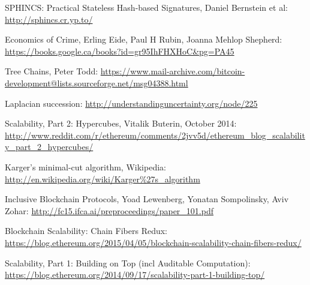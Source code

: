 \documentclass[11pt,a4paper]{article}
\theoremstyle{plain}
\theoremstyle{definition}
\theoremstyle{remark}
\begin{document}
\begin{thebibliography}{34}
    SPHINCS: Practical Stateless Hash-based Signatures, Daniel Bernstein et al: \url{http://sphincs.cr.yp.to/}

    Economics of Crime, Erling Eide, Paul H Rubin, Joanna Mehlop Shepherd: \url{https://books.google.ca/books?id=gr95IhFHXHoC&pg=PA45}

    Tree Chains, Peter Todd: \url{https://www.mail-archive.com/bitcoin-development@lists.sourceforge.net/msg04388.html}

    Laplacian succession: \url{http://understandinguncertainty.org/node/225}

    Scalability, Part 2: Hypercubes, Vitalik Buterin, October 2014: \url{http://www.reddit.com/r/ethereum/comments/2jvv5d/ethereum_blog_scalability_part_2_hypercubes/}

    Karger's minimal-cut algorithm, Wikipedia: \url{http://en.wikipedia.org/wiki/Karger%27s_algorithm}

    Inclusive Blockchain Protocols, Yoad Lewenberg, Yonatan Sompolinsky, Aviv Zohar: \url{http://fc15.ifca.ai/preproceedings/paper_101.pdf}

    Blockchain Scalability: Chain Fibers Redux: \url{https://blog.ethereum.org/2015/04/05/blockchain-scalability-chain-fibers-redux/}

    Scalability, Part 1: Building on Top (incl Auditable Computation): \url{https://blog.ethereum.org/2014/09/17/scalability-part-1-building-top/}

\end{thebibliography}
\end{document}

